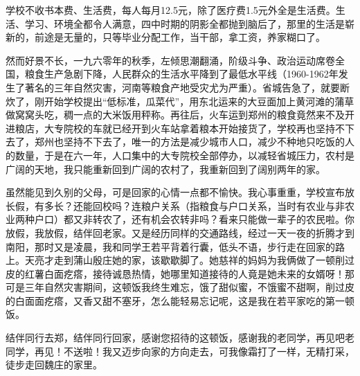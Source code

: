 学校不收书本费、生活费，每人每月12.5元，除了医疗费1.5元外全是生活费。生活、学习、环境全都令人满意，四中时期的阴影全都抛到脑后了，那里的生活是崭新的，前途是无量的，只等毕业分配工作，当干部，拿工资，养家糊口了。

然而好景不长，一九六零年的秋季，左倾思潮翻涌，阶级斗争、政治运动席卷全国，粮食生产急剧下降，人民群众的生活水平降到了最低水平线（1960-1962年发生了著名的三年自然灾害，河南等粮食产地受灾尤为严重）。省城告急了，就要断炊了，刚开始学校提出“低标准，瓜菜代”，用东北运来的大豆面加上黄河滩的蒲草做窝窝头吃，稠一点的大米饭用秤称。再往后，火车运到郑州的粮食竟然来不及开进粮店，大专院校的车就已经开到火车站拿着粮本开始接货了，学校再也坚持不下去了，郑州也坚持不下去了，唯一的方法是减少城市人口，减少不种地只吃饭的人的数量，于是在六一年，人口集中的大专院校全部停办，以减轻省城压力，农村是广阔的天地，我只能重新回到广阔的农村了，我重新回到了阔别两年的家。

虽然能见到久别的父母，可是回家的心情一点都不愉快。我心事重重，学校宣布放长假，有多长？还能回校吗？连粮户关系（指粮食与户口关系，当时有农业与非农业两种户口）都又非转农了，还有机会农转非吗？看来只能做一辈子的农民啦。你放假，我放假，结伴回老家。又是经历同样的交通路线，经过一天一夜的折腾才到南阳，那时又是凌晨，我和同学王若平背着行囊，低头不语，步行走在回家的路上。天亮才走到蒲山殷庄她的家，该歇歇脚了。她慈祥的妈妈为我俩做了一顿削过皮的红薯白面疙瘩，接待诚恳热情，她哪里知道接待的人竟是她未来的女婿呀！那可是三年自然灾害期间，这顿饭我终生难忘，饿了甜似蜜，不饿蜜不甜啊，削过皮的白面面疙瘩，又香又甜不塞牙，怎么能轻易忘记呢，这是我在若平家吃的第一顿饭。

结伴同行去郑，结伴同行回家，感谢您招待的这顿饭，感谢我的老同学，再见吧老同学，再见！不送啦！我又迈步向家的方向走去，可我像霜打了一样，无精打采，徒步走回魏庄的家里。

